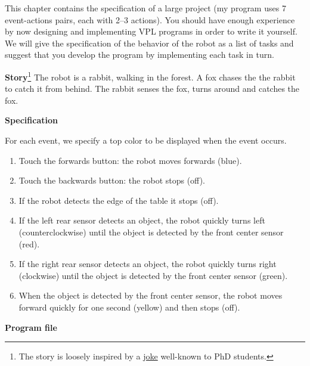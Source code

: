 \label{ch.rabbit}

This chapter contains the specification of a large project (my program
uses 7 event-actions pairs, each with 2--3 actions). You should have
enough experience by now designing and implementing VPL programs in
order to write it yourself. We will give the specification of the
behavior of the robot as a list of tasks and suggest that you develop
the program by implementing each task in turn.


\textbf{Story}\footnote{The story is loosely inspired by a
\href{http://www.cs.hmc.edu/~fleck/parable.html}{joke}
well-known to PhD students.} The robot is a rabbit,
walking in the forest. A fox chases the the rabbit to catch
it from behind. The rabbit senses the fox, turns around and catches the
fox.


\textbf{Specification}

For each event, we specify a top color to be displayed when the event occurs.

\begin{enumerate}
\item Touch the forwards button: the robot moves forwards (blue).
\item Touch the backwards button: the robot stops (off).
\item If the robot detects the edge of the table it stops (off).
\item If the left rear sensor detects an object, the robot quickly turns
left (counterclockwise) until the object is detected by the front center
sensor (red).
\item If the right rear sensor detects an object, the robot quickly turns
right (clockwise) until the object is detected by the front center
sensor (green).
\item When the object is detected by the front center sensor, the robot
moves forward quickly for one second (yellow) and then stops (off).
\end{enumerate}

{\raggedleft \hfill \textbf{Program file} }

